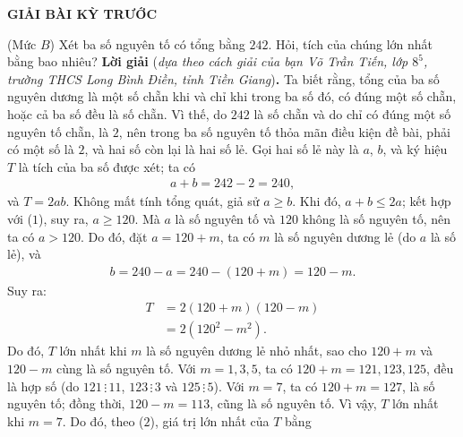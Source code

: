 \newpage
	\begin{center}
		{\large{\textbf{\color{thachthuctoanhoc}GIẢI BÀI KỲ TRƯỚC}}}
	\end{center}
\begin{multicols}{2}
	\setlength{\abovedisplayskip}{4pt}
	\setlength{\belowdisplayskip}{4pt}
	{}
	(Mức $B$) Xét ba số nguyên tố có tổng bằng $242$. Hỏi,  tích của chúng lớn nhất bằng bao nhiêu?
	\vskip 0.05cm
	\textbf{\color{thachthuctoanhoc}Lời giải} (\textit{dựa theo cách giải của bạn Võ Trần Tiến, lớp $8^5$, trường THCS Long Bình Điền, tỉnh Tiền Giang})\textbf{\color{thachthuctoanhoc}.}
	\vskip 0.05cm
	Ta biết rằng, tổng của ba số nguyên dương là một số chẵn khi và chỉ khi trong ba số đó, có đúng một số chẵn, hoặc cả ba số đều là số chẵn. Vì thế, do $242$ là số chẵn và do chỉ có đúng một số nguyên tố chẵn, là $2$, nên trong ba số nguyên tố thỏa mãn điều kiện đề bài, phải có một số là $2$, và hai số còn lại là hai số lẻ. Gọi hai số lẻ này là $a$, $b$, và ký hiệu $T$ là tích của ba số được xét; ta có
	\begin{align*}
		a + b = 242 - 2 = 240,                          \tag{$1$}
	\end{align*}
	và $T = 2ab$.
	\vskip 0.05cm
	Không mất tính tổng quát, giả sử $a \ge b$. Khi đó, $a + b \le 2a$; kết hợp với ($1$), suy ra, $a \ge 120$. Mà $a$ là số nguyên tố và $120$ không là số nguyên tố, nên ta có $a > 120$. Do đó, đặt $a = 120 + m$, ta có $m$ là số nguyên dương lẻ (do $a$ là số lẻ), và
	\begin{align*}
		b = 240 - a = 240 - (120 + m) = 120 - m.
	\end{align*}
	Suy ra:
	\begin{align*}
		T &= 2\left( {120 + m} \right)\left( {120 - m} \right) \\
		&= 2\left( {{{120}^2} - {m^2}} \right). \tag{$2$}
	\end{align*}
	Do đó, $T$ lớn nhất khi $m$ là số nguyên dương lẻ nhỏ nhất, sao cho $120 + m$ và $120 - m$ cùng là số nguyên tố.
	\vskip 0.05cm
	Với $m \!=\! 1, 3, 5$, ta có $120 \!+\! m \!=\! 121, 123, 125$, đều là hợp số (do  $121 \,\vdots\, 11$, $123  \,\vdots\,  3$  và  $125 \,\vdots\, 5$).
	\vskip 0.05cm
	Với $m = 7$, ta có $120 + m = 127$, là số nguyên tố; đồng thời, $120 - m = 113$, cũng là số nguyên tố.
	\vskip 0.05cm
	Vì vậy, $T$ lớn nhất khi $m = 7$. Do đó, theo ($2$), giá trị lớn nhất của $T$ bằng

\end{multicols}
